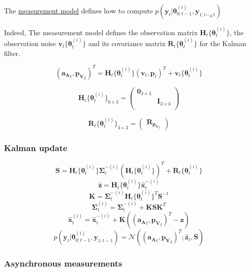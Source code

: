 \documentclass[12pt,]{article}
\begin{document}
The \protect\hyperlink{measurements-model-1}{measurement model} defines
how to compute
\(p(\mathbf{y}_t | \boldsymbol{\theta}^{(i)}_{0:t-1}, \mathbf{y}_{1:t-_K1})\)

Indeed, The measurement model defines the observation matrix
\(\mathbf{H}_t\{\boldsymbol{\theta}^{(i)}_t\}\), the observation noise
\(\mathbf{v}_t\{\boldsymbol{\theta}^{(i)}_t\}\) and its covariance
matrix \(\mathbf{R}_t\{\boldsymbol{\theta}^{(i)}_t\}\) for the Kalman
filter.

\[(\mathbf{a_A}_t, \mathbf{p_V}_t)^T  = \mathbf{H}_t\{\boldsymbol{\theta}^{(i)}_t\} (\mathbf{v}_t, \mathbf{p}_t)^T + \mathbf{v}_t\{\boldsymbol{\theta}^{(i)}_t\}\]

\[\mathbf{H}_t\{\boldsymbol{\theta}^{(i)}_t\}_{6 \times 3} = 
\left( \begin{array}{cc}
\mathbf{0}_{3 \times 3} & \\
& \mathbf{I}_{3 \times 3} \\
\end{array} \right)\]

\[\mathbf{R}_t\{\boldsymbol{\theta}^{(i)}_t\}_{3 \times 3} = 
\left( \begin{array}{c}
\mathbf{R}_{\mathbf{p_V}_t} 
\end{array} \right)\]

\subsubsection{Kalman update}\label{kalman-update-1}

\[\mathbf{S} = \mathbf{H}_t\{\boldsymbol{\theta}^{(i)}_t\} \mathbf{\Sigma}^{-(i)}_t  (\mathbf{H}_t\{\boldsymbol{\theta}^{(i)}_t\})^T + \mathbf{R}_t\{\boldsymbol{\theta}^{(i)}_t\}\]
\[\hat{\mathbf{z}} = \mathbf{H}_t\{\boldsymbol{\theta}^{(i)}_t\}  \hat{\mathbf{x}}^{-(i)}_t\]
\[\mathbf{K} = \mathbf{\Sigma}^{-(i)}_t \mathbf{H}_t\{\boldsymbol{\theta}^{(i)}_t\}^T \mathbf{S}^{-1}\]
\[\mathbf{\Sigma}^{(i)}_t = \mathbf{\Sigma}^{-(i)}_t + \mathbf{K} \mathbf{S} \mathbf{K}^T\]
\[\hat{\mathbf{x}}^{(i)}_t = \hat{\mathbf{x}}^{-(i)}_t  + \mathbf{K}((\mathbf{a_A}_t, \mathbf{p_V}_t)^T - \hat{\mathbf{z}})\]
\[p(\mathbf{y}_t | \boldsymbol{\theta}^{(i)}_{0:t-1}, \mathbf{y}_{1:t-1}) = \mathcal{N}((\mathbf{a_A}_t, \mathbf{p_V}_t)^T; \hat{\mathbf{z}}_t, \mathbf{S})\]

\subsubsection{Asynchronous
measurements}\label{asynchronous-measurements}
\end{document}
